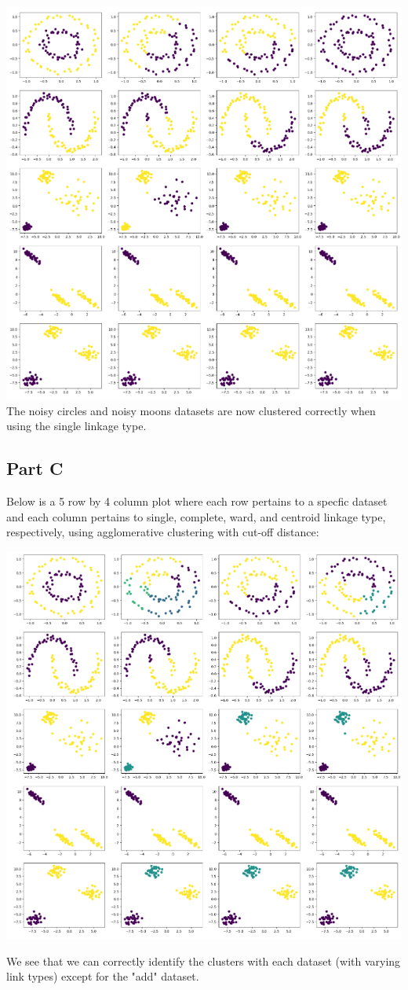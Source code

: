 \documentclass{article}
\begin{document}
\includegraphics[width=\linewidth]{Images/Screenshot 2024-03-26 083537.png}
The noisy circles and noisy moons datasets are now clustered correctly when using the single linkage type.

\subsection*{Part C}
Below is a 5 row by 4 column plot where each row pertains to a specfic dataset and each column pertains to single, 
complete, ward, and centroid linkage type, respectively, using agglomerative clustering with cut-off distance:

\includegraphics[width=\linewidth]{Images/Screenshot 2024-03-26 083654.png}

We see that we can correctly identify the clusters with each dataset (with varying link types) except for the 
"add" dataset.
\end{document}
